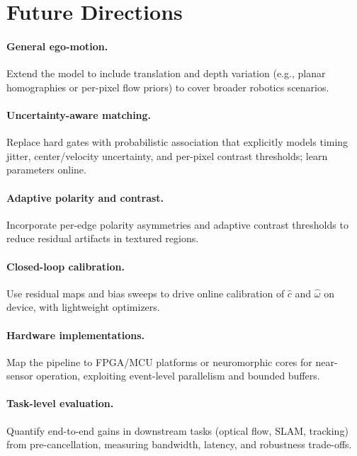 \section{Future Directions}
\paragraph{General ego-motion.} Extend the model to include translation and depth variation (e.g., planar homographies or per-pixel flow priors) to cover broader robotics scenarios.

\paragraph{Uncertainty-aware matching.} Replace hard gates with probabilistic association that explicitly models timing jitter, center/velocity uncertainty, and per-pixel contrast thresholds; learn parameters online.

\paragraph{Adaptive polarity and contrast.} Incorporate per-edge polarity asymmetries and adaptive contrast thresholds to reduce residual artifacts in textured regions.

\paragraph{Closed-loop calibration.} Use residual maps and bias sweeps to drive online calibration of $\hat c$ and $\hat\omega$ on device, with lightweight optimizers.

\paragraph{Hardware implementations.} Map the pipeline to FPGA/MCU platforms or neuromorphic cores for near-sensor operation, exploiting event-level parallelism and bounded buffers.

\paragraph{Task-level evaluation.} Quantify end-to-end gains in downstream tasks (optical flow, SLAM, tracking) from pre-cancellation, measuring bandwidth, latency, and robustness trade-offs.
